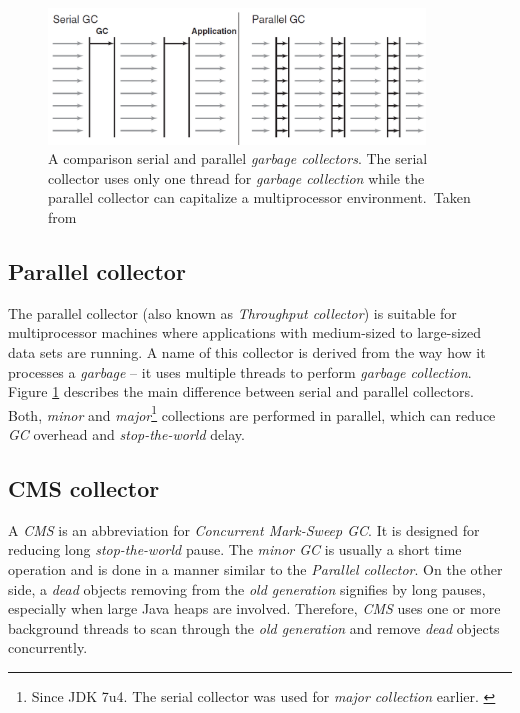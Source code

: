 \documentclass[
  digital, %
  oneside,
  notable, %
  nolof,     %
  nolot     %
]{fithesis3}
\begin{document}
\begin{figure}[h]
	\centering
	\includegraphics[width=10cm]{fig/serialparallel.png}
	\caption{A comparison serial and parallel \textit{garbage collectors}. The serial collector uses only one thread for \textit{garbage collection} while the parallel collector can capitalize a multiprocessor environment.~Taken from \cite{hunt}}
	\label{serialparallel}
\end{figure}

\subsection{Parallel collector}
The parallel collector (also known as \textit{Throughput collector}) is suitable for multiprocessor machines where applications with medium-sized to large-sized data sets are running. A name of this collector is derived from the way how it processes a \textit{garbage} -- it uses multiple threads to perform \textit{garbage collection}. Figure \ref{serialparallel} describes the main difference between serial and parallel collectors. Both, \textit{minor} and \textit{major}\footnote{Since JDK 7u4. The serial collector was used for \textit{major collection} earlier. \cite{scott}} collections are performed in parallel, which can reduce \textit{GC} overhead and \textit{stop-the-world} delay. \cite{gctuning} \cite{scott} \cite{hunt}

\subsection{CMS collector}
A \textit{CMS} is an abbreviation for \textit{Concurrent Mark-Sweep GC}. It is designed for reducing long \textit{stop-the-world} pause. The \textit{minor GC} is usually a short time operation and is done in a manner similar to the \textit{Parallel collector}. On the other side, a \textit{dead} objects removing from the \textit{old generation} signifies by long pauses, especially when large Java heaps are involved. Therefore, \textit{CMS} uses one or more background threads to scan through the \textit{old generation} and remove \textit{dead} objects concurrently. \cite{scott} \cite{gctuning}
\end{document}
